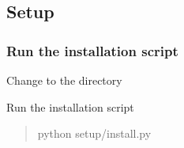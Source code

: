 \documentclass[a4paper,10pt,english]{report}
\begin{document}
\subsection{Setup}
\label{\detokenize{user/general/installation:setup}}\label{\detokenize{user/general/installation:installation-setup}}

\subsubsection{Run the installation script}
\label{\detokenize{user/general/installation:run-the-installation-script}}
Change to the  directory

Run the installation script
\begin{quote}

\begin{sphinxVerbatim}[commandchars=\\\{\}]
python setup/install.py
\end{sphinxVerbatim}
\end{quote}
\end{document}
